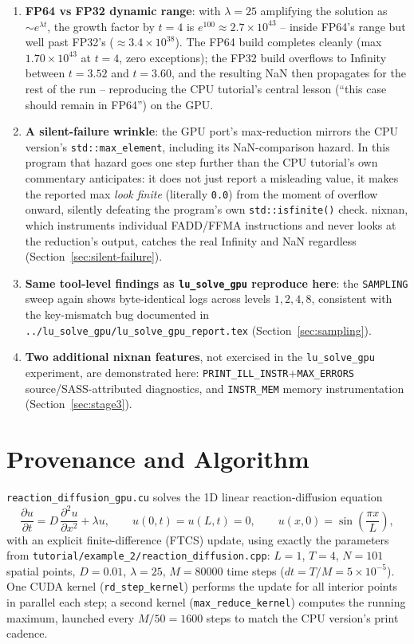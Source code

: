 \documentclass[11pt,a4paper]{article}
\begin{document}
\begin{enumerate}
  \item \textbf{FP64 vs FP32 dynamic range}: with $\lambda=25$ amplifying
    the solution as $\sim e^{\lambda t}$, the growth factor by $t=4$ is
    $e^{100}\approx 2.7\times10^{43}$ -- inside FP64's range but well past
    FP32's ($\approx 3.4\times10^{38}$). The FP64 build completes cleanly
    (max $1.70\times10^{43}$ at $t=4$, zero exceptions); the FP32 build
    overflows to Infinity between $t=3.52$ and $t=3.60$, and the resulting
    NaN then propagates for the rest of the run -- reproducing the CPU
    tutorial's central lesson (``this case should remain in FP64'') on the
    GPU.
  \item \textbf{A silent-failure wrinkle}: the GPU port's max-reduction
    mirrors the CPU version's \texttt{std::max\_element}, including its
    NaN-comparison hazard. In this program that hazard goes one step
    further than the CPU tutorial's own commentary anticipates: it does
    not just report a misleading value, it makes the reported max
    \emph{look finite} (literally \texttt{0.0}) from the moment of overflow
    onward, silently defeating the program's own \texttt{std::isfinite()}
    check. nixnan, which instruments individual FADD/FFMA instructions and
    never looks at the reduction's output, catches the real Infinity and
    NaN regardless (Section~\ref{sec:silent-failure}).
  \item \textbf{Same tool-level findings as \texttt{lu\_solve\_gpu}
    reproduce here}: the \texttt{SAMPLING} sweep again shows byte-identical
    logs across levels $1,2,4,8$, consistent with the key-mismatch bug
    documented in \texttt{../lu\_solve\_gpu/lu\_solve\_gpu\_report.tex}
    (Section~\ref{sec:sampling}).
  \item \textbf{Two additional nixnan features}, not exercised in the
    \texttt{lu\_solve\_gpu} experiment, are demonstrated here:
    \texttt{PRINT\_ILL\_INSTR}+\texttt{MAX\_ERRORS} source/SASS-attributed
    diagnostics, and \texttt{INSTR\_MEM} memory instrumentation
    (Section~\ref{sec:stage3}).
\end{enumerate}

\section{Provenance and Algorithm}

\texttt{reaction\_diffusion\_gpu.cu} solves the 1D linear reaction-diffusion
equation
\[
\frac{\partial u}{\partial t} = D\,\frac{\partial^2 u}{\partial x^2} + \lambda u,
\qquad u(0,t)=u(L,t)=0, \qquad u(x,0)=\sin\!\left(\frac{\pi x}{L}\right),
\]
with an explicit finite-difference (FTCS) update, using exactly the
parameters from \texttt{tutorial/example\_2/reaction\_diffusion.cpp}:
$L=1$, $T=4$, $N=101$ spatial points, $D=0.01$, $\lambda=25$, $M=80000$
time steps ($dt = T/M = 5\times10^{-5}$). One CUDA kernel
(\texttt{rd\_step\_kernel}) performs the update for all interior points in
parallel each step; a second kernel (\texttt{max\_reduce\_kernel}) computes
the running maximum, launched every $M/50 = 1600$ steps to match the CPU
version's print cadence.
\end{document}
